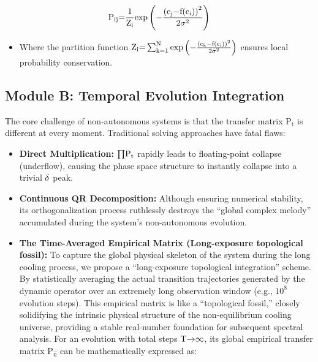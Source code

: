 \documentclass[fleqn,10pt]{wlscirep}
\begin{document}
\[\text{P}_{\text{ij}}\text{=}\frac{\text{1}}{\text{Z}_{\text{i}}}\text{exp}\left( \text{\ensuremath{-}}\frac{\text{(}\text{c}_{\text{j}}\text{\ensuremath{-}}\text{f}\text{(}\text{c}_{\text{i}}\text{)}\text{)}^{\text{2}}}{\text{2}\text{\ensuremath{\sigma}}^{\text{2}}} \right)\]

\begin{itemize}
\item
  Where the partition function
  \(\text{Z}_{\text{i}}\text{=}\sum_{\text{k}\text{=1}}^{\text{N}}\text{exp}\left( \text{\ensuremath{-}}\frac{\text{(}\text{c}_{\text{k}}\text{\ensuremath{-}}\text{f}\text{(}\text{c}_{\text{i}}\text{)}\text{)}^{\text{2}}}{\text{2}\text{\ensuremath{\sigma}}^{\text{2}}} \right)\)
  ensures local probability conservation.
\end{itemize}

\subsection*{Module B: Temporal Evolution Integration}

The core challenge of non-autonomous systems is that the transfer matrix
\(\text{P}_{\text{t}}\) is different at every moment. Traditional
solving approaches have fatal flaws:

\begin{itemize}
\item
  \textbf{Direct Multiplication:} \(\text{\ensuremath{\prod}}\text{P}_{\text{t}}\)
  rapidly leads to floating-point collapse (underflow), causing the
  phase space structure to instantly collapse into a trivial
  \(\text{\ensuremath{\delta}}\) peak.
\item
  \textbf{Continuous QR Decomposition:} Although ensuring numerical
  stability, its orthogonalization process ruthlessly destroys the
  ``global complex melody'' accumulated during the system's
  non-autonomous evolution.
\item
  \textbf{The Time-Averaged Empirical Matrix (Long-exposure topological
  fossil):} To capture the global physical skeleton of the system during
  the long cooling process, we propose a ``long-exposure topological
  integration'' scheme. By statistically averaging the actual transition
  trajectories generated by the dynamic operator over an extremely long
  observation window (e.g., \(\text{10}^{\text{8}}\) evolution steps).
  This empirical matrix is like a ``topological fossil,'' closely
  solidifying the intrinsic physical structure of the non-equilibrium
  cooling universe, providing a stable real-number foundation for
  subsequent spectral analysis. For an evolution with total steps
  \(\text{T}\text{\ensuremath{\rightarrow}\ensuremath{\infty}}\), its global empirical transfer matrix
  \(\text{P}_{\text{ij}}\) can be mathematically expressed as:
\end{itemize}
\end{document}

